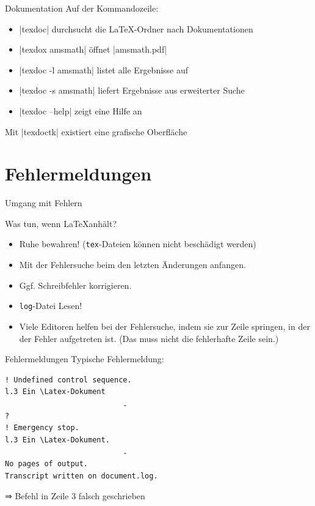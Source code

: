 \documentclass[
	vorläufig=true,
	datum=2016-10-28,
	titel={Allgemeine Formatierung und Pakete},
	web=false,
]{../tex/latexkurs-slides}
\begin{document}
\begin{frame}[fragile]{Dokumentation}
	Auf der Kommandozeile:
	\begin{itemize}
		\item |texdoc| durchsucht die \LaTeX-Ordner nach Dokumentationen
		\item |texdox amsmath| öffnet |amsmath.pdf|
		\item |texdoc -l amsmath| listet alle Ergebnisse auf
		\item |texdoc -s amsmath| liefert Ergebnisse aus erweiterter Suche
		\item |texdoc --help| zeigt eine Hilfe an
	\end{itemize}
	Mit |texdoctk| existiert eine grafische Oberfläche
\end{frame}

\section{Fehlermeldungen}
\begin{frame}[t]{Umgang mit Fehlern}
	\begin{block}{Was tun, wenn \LaTeX anhält?}
		\begin{itemize}
			\item Ruhe bewahren! (\texttt{tex}-Dateien können nicht beschädigt werden)
			\item Mit der Fehlersuche beim den letzten Änderungen anfangen.
			\item Ggf. Schreibfehler korrigieren.
			\item \texttt{log}-Datei Lesen!
			\item Viele Editoren helfen bei der Fehlersuche, indem sie zur Zeile springen, in der der Fehler aufgetreten ist. (Das muss nicht die fehlerhafte Zeile sein.)
		\end{itemize}
	\end{block}
\end{frame}

\begin{frame}[fragile,t]{Fehlermeldungen}
Typische Fehlermeldung:
\begin{lstlisting}
! Undefined control sequence.
l.3 Ein \Latex-Dokument
                           .
? 
! Emergency stop.
l.3 Ein \Latex-Dokument.
                           .
No pages of output.
Transcript written on document.log.
\end{lstlisting}
⇒ Befehl in Zeile 3 falsch geschrieben
\end{frame}

\end{document}
